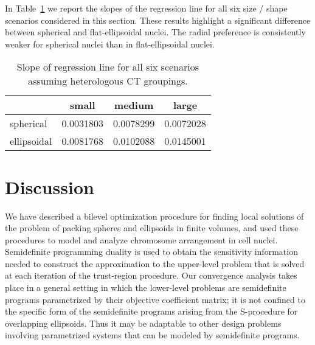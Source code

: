 \documentclass{siamltex}
\begin{document}
In Table~\ref{table_slope_1.25} we report the slopes of the regression
line for all six size / shape scenarios considered in this
section. These results highlight a significant difference between
spherical and flat-ellipsoidal nuclei. The radial preference is
consistently weaker for spherical nuclei than in flat-ellipsoidal
nuclei.

\begin{table}[!h]
\centering
\caption{Slope of regression line for all six scenarios assuming heterologous CT groupings.}
\label{table_slope_1.25}
\begin{tabular}{l | c c c}
 & small & medium & large \\ \hline
 spherical & 0.0031803 & 0.0078299 & 0.0072028 \\
 ellipsoidal & 0.0081768 & 0.0102088 & 0.0145001 \end{tabular}
 \end{table}

\section{Discussion} \label{sec:discussion}

We have described a bilevel optimization procedure for finding local
solutions of the problem of packing spheres and ellipsoids in finite
volumes, and used these procedures to model and analyze chromosome
arrangement in cell nuclei. Semidefinite programming duality is used
to obtain the sensitivity information needed to construct the
approximation to the upper-level problem that is solved at each
iteration of the trust-region procedure.  Our convergence analysis
takes place in a general setting in which the lower-level problems are
semidefinite programs parametrized by their objective coefficient
matrix; it is not confined to the specific form of the semidefinite
programs arising from the S-procedure for overlapping ellipsoids. Thus
it may be adaptable to other design problems involving parametrized
systems that can be modeled by semidefinite programs.
\end{document}

